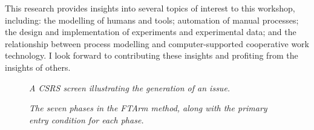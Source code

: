 This research provides insights into several topics of interest to this
workshop, including: the modelling of humans and tools; automation of
manual processes; the design and implementation of experiments and
experimental data; and the relationship between process modelling and
computer-supported cooperative work technology.  I look forward to
contributing these insights and profiting from the insights of others.


\begin{figure*} 
 {\centerline{}}
\caption{{\em A CSRS screen illustrating the generation of an issue.}}
\label{fig:issue-screen}
\end{figure*}

\begin{figure*} 
 {\centerline{}}
\caption{{\em The seven phases in the FTArm method, along with the primary
entry condition for each phase.}}
\label{fig:process-model}
\end{figure*}











